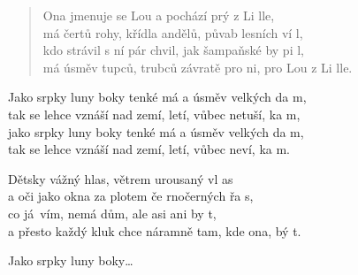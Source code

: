 
\begin{song}{}
\begin{verse}
   Ona jmenuje se Lou a pochází prý z Li lle, \\
   má čertů rohy, křídla andělů, půvab lesních ví l, \\
   kdo strávil s ní pár chvil, jak šampaňské by pi l, \\
   má úsměv tupců, trubců závratě pro ni, pro Lou z Li lle.
\end{verse}
\begin{refren}
   Jako srpky luny boky tenké má a úsměv velkých da m, \\
   tak se lehce vznáší nad zemí, letí, vůbec netuší, ka m, \\ 
   jako srpky luny boky tenké má a úsměv velkých da m, \\
   tak se lehce vznáší nad zemí, letí, vůbec neví, ka m.
\end{refren}
\begin{deco}
   Dětsky vážný hlas, větrem urousaný vl as \\
   a oči jako okna za plotem če rnočerných řa s, \\
   co já~vím, nemá dům, ale asi ani by t, \\
   a přesto každý kluk chce náramně tam, kde ona, bý t.
\end{deco}
\begin{refren}
   Jako srpky luny boky\ldots
\end{refren}
\chordbreak
\compactbreak


\end{song}
